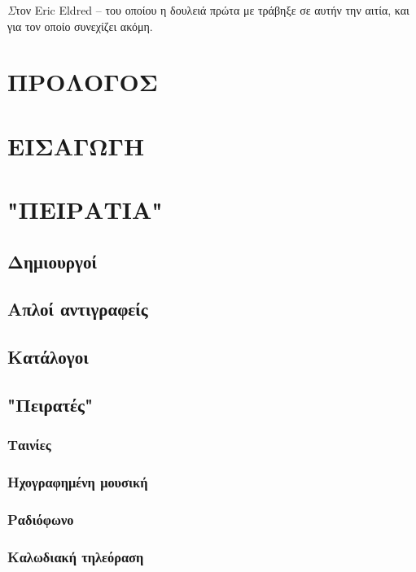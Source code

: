 \documentclass[a5paper,11pt]{book}
\begin{document}

\thispagestyle{empty}

\frontmatter



\null \newpage

\thispagestyle{empty}
\null \vspace{35pt}
\begin{center}
{\textit Στον Eric Eldred -- του οποίου η δουλειά πρώτα με τράβηξε σε αυτήν την αιτία, και για τον οποίο συνεχίζει ακόμη.}
\end{center}


\tableofcontents

\setmainfont[Mapping=tex-text]{DejaVu Serif}
\chapter{ΠΡΟΛΟΓΟΣ}


\chapter{ΕΙΣΑΓΩΓΗ}


\mainmatter
\chapter{"ΠΕΙΡΑΤΙΑ"}
\section{Δημιουργοί}
\section{Απλοί αντιγραφείς}
\section{Κατάλογοι}
\section{"Πειρατές"}
\subsection{Ταινίες}
\subsection{Ηχογραφημένη μουσική}
\subsection{Ραδιόφωνο}
\subsection{Καλωδιακή τηλεόραση}

\backmatter
\end{document}
